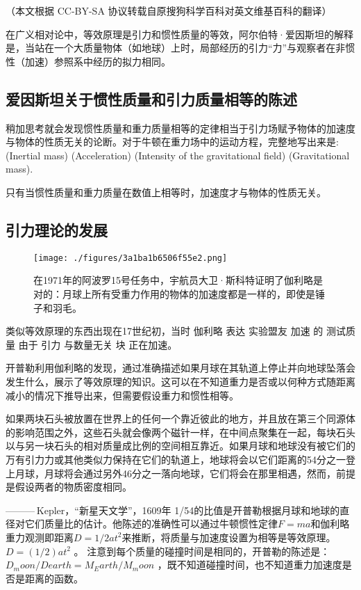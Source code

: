 
（本文根据 CC-BY-SA 协议转载自原搜狗科学百科对英文维基百科的翻译）

在广义相对论中，等效原理是引力和惯性质量的等效，阿尔伯特·爱因斯坦的解释是，当站在一个大质量物体（如地球）上时，局部经历的引力“力”与观察者在非惯性（加速）参照系中经历的拟力相同。

\subsection{爱因斯坦关于惯性质量和引力质量相等的陈述}

稍加思考就会发现惯性质量和重力质量相等的定律相当于引力场赋予物体的加速度与物体的性质无关的论断。对于牛顿在重力场中的运动方程，完整地写出来是:
(Inertial mass)   (Acceleration)   (Intensity of the gravitational field)   (Gravitational mass).

只有当惯性质量和重力质量在数值上相等时，加速度才与物体的性质无关。

\subsection{引力理论的发展}

\begin{figure}[ht]
\centering
\texttt{[image: ./figures/3a1ba1b6506f55e2.png]}
\caption{在1971年的阿波罗15号任务中，宇航员大卫·斯科特证明了伽利略是对的：月球上所有受重力作用的物体的加速度都是一样的，即使是锤子和羽毛。} \label{fig_DXYL_1}
\end{figure}

类似等效原理的东西出现在17世纪初，当时 伽利略 表达 实验盟友 加速 的 测试质量 由于 引力 与数量无关 块 正在加速。

开普勒利用伽利略的发现，通过准确描述如果月球在其轨道上停止并向地球坠落会发生什么，展示了等效原理的知识。这可以在不知道重力是否或以何种方式随距离减小的情况下推导出来，但需要假设重力和惯性相等。

如果两块石头被放置在世界上的任何一个靠近彼此的地方，并且放在第三个同源体的影响范围之外，这些石头就会像两个磁针一样，在中间点聚集在一起，每块石头以与另一块石头的相对质量成比例的空间相互靠近。如果月球和地球没有被它们的万有引力力或其他类似力保持在它们的轨道上，地球将会以它们距离的54分之一登上月球，月球将会通过另外46分之一落向地球，它们将会在那里相遇，然而，前提是假设两者的物质密度相同。

——— Kepler，“新星天文学”，1609年
1/54的比值是开普勒根据月球和地球的直径对它们质量比的估计。他陈述的准确性可以通过牛顿惯性定律$F=ma$和伽利略重力观测即距离$D=1/2at^2$来推断，将质量与加速度设置为相等是等效原理。$D=(1/2) at^2$ 。 注意到每个质量的碰撞时间是相同的，开普勒的陈述是：$D_moon/Dearth = M_Earth/M_moon$ ，既不知道碰撞时间，也不知道重力加速度是否是距离的函数。

